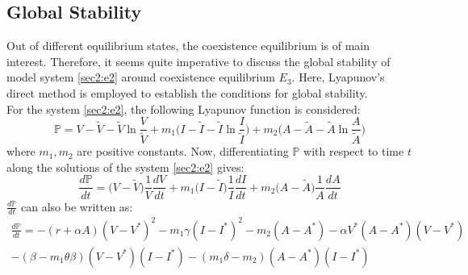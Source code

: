 \documentclass[12pt]{article}
\numberwithin{equation}{section}
\begin{document}
\subsection{Global Stability}
Out of different equilibrium states, the coexistence equilibrium is of main interest. Therefore, it seems quite imperative to discuss the global stability of model system \eqref{sec2:e2} around coexistence equilibrium $E_3$. Here, Lyapunov's direct method is employed to establish the conditions for global stability.\\
For the system \eqref{sec2:e2}, the following Lyapunov function is considered:
\begin{equation}\label{sec3:e36}
\mathbb P = V-\tilde V-\tilde V\ln\frac{V}{\tilde V}+m_1\bigg(I-\tilde I-\tilde I\ln\frac{I}{\tilde I}\bigg)+m_2\bigg(A-\tilde A-\tilde A\ln\frac{A}{\tilde A}\bigg)
\end{equation}
where $m_1,m_2$ are positive constants. Now, differentiating $\mathbb P$ with respect to time $t$ along the solutions of the system \eqref{sec2:e2} gives:
\begin{equation}\label{sec3:e37}
\frac{d\mathbb P}{dt}=\bigg(V-\tilde V\bigg)\frac{1}{V}\frac{dV}{dt} + m_1\bigg(I-\tilde I\bigg)\frac{1}{I}\frac{dI}{dt} + m_2 \bigg(A-\tilde A\bigg)\frac{1}{A}\frac{dA}{dt}
\end{equation}
$\frac{d \mathbb P}{dt}$ can also be written as:
\begin{equation}\label{sec3:e41}
\begin{split}
\frac{d\mathbb P}{dt} = -(r+\alpha A)(V-V^*)^2 - m_1\gamma(I-I^*)^2-m_2(A-A^*)-\alpha V^*(A-A^*)(V-V^*)\\ - (\beta-m_1\theta\beta)(V-V^*)(I-I^*) - (m_1\delta-m_2)(A-A^*)(I-I^*)
\end{split}
\end{equation}
\end{document}
